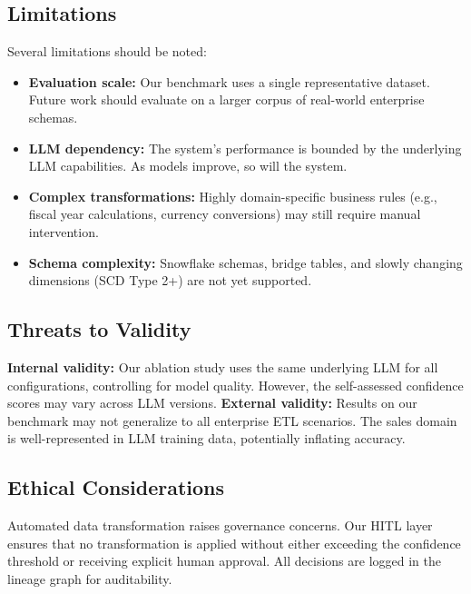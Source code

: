 \documentclass[conference]{IEEEtran}
\begin{document}
\subsection{Limitations}

Several limitations should be noted:
\begin{itemize}
  \item \textbf{Evaluation scale:} Our benchmark uses a single representative
    dataset. Future work should evaluate on a larger corpus of real-world
    enterprise schemas.
  \item \textbf{LLM dependency:} The system's performance is bounded by the
    underlying LLM capabilities. As models improve, so will the system.
  \item \textbf{Complex transformations:} Highly domain-specific business rules
    (e.g., fiscal year calculations, currency conversions) may still require
    manual intervention.
  \item \textbf{Schema complexity:} Snowflake schemas, bridge tables, and
    slowly changing dimensions (SCD Type 2+) are not yet supported.
\end{itemize}

\subsection{Threats to Validity}

\textbf{Internal validity:} Our ablation study uses the same underlying LLM
for all configurations, controlling for model quality. However, the
self-assessed confidence scores may vary across LLM versions.
\textbf{External validity:} Results on our benchmark may not generalize to all
enterprise ETL scenarios. The sales domain is well-represented in LLM training
data, potentially inflating accuracy.

\subsection{Ethical Considerations}

Automated data transformation raises governance concerns. Our HITL layer
ensures that no transformation is applied without either exceeding the
confidence threshold or receiving explicit human approval. All decisions are
logged in the lineage graph for auditability.

\end{document}
